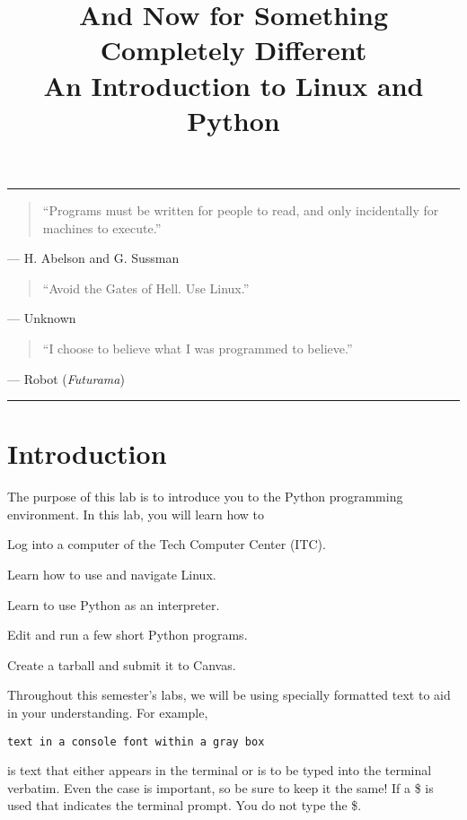 \documentclass[11pt]{cselabheader}
\title{And Now for Something Completely Different\\
  {\large An Introduction to Linux and Python}}
\begin{document}
\maketitle

\hrule

\begin{quotation}
  ``Programs must be written for people to read, and only incidentally for
  machines to execute.''
\end{quotation}
\begin{flushright}
--- H. Abelson and G. Sussman
\end{flushright}

\begin{quotation}
``Avoid the Gates of Hell. Use Linux.''
\end{quotation}
\begin{flushright}
--- Unknown
\end{flushright}

\begin{quotation}
``I choose to believe what I was programmed to believe.''
\end{quotation}
\begin{flushright}
  --- Robot (\textit{Futurama})
\end{flushright}

\hrule
\section{Introduction}

The purpose of this lab is to introduce you to the Python programming
environment. In this lab, you will learn how to
\begin{enumerate*}
  \item Log into a computer of the Tech Computer Center (ITC).
  \item Learn how to use and navigate Linux.
  \item Learn to use Python as an interpreter.
  \item Edit and run a few short Python programs.
  \item Create a tarball and submit it to Canvas.
\end{enumerate*}

Throughout this semester's labs, we will be using specially formatted text to
aid in your understanding. For example,
\begin{lstlisting}[style=bash]
text in a console font within a gray box
\end{lstlisting}
is text that either appears in the terminal or is to be typed into the terminal
verbatim. Even the case is important, so be sure to keep it the same! If a \$ is
used that indicates the terminal prompt. You do not type the \$.
\end{document}
